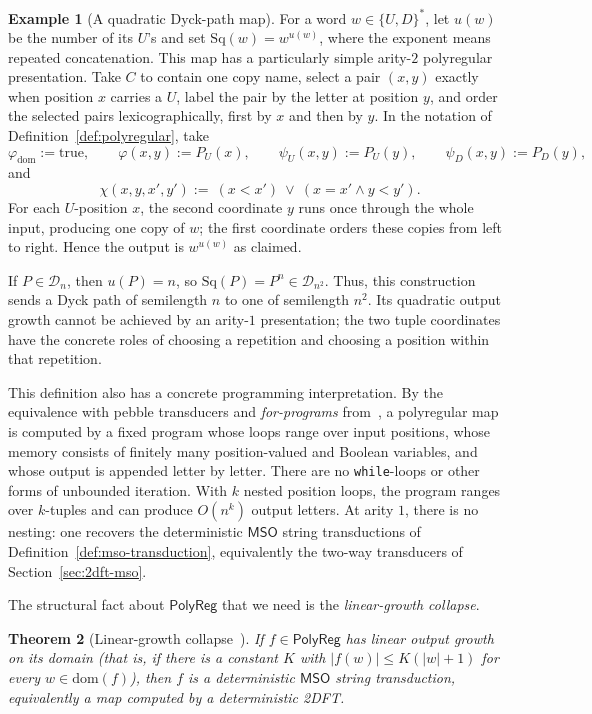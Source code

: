 \documentclass[11pt]{article}
\newtheorem{theorem}{Theorem}[section]
\theoremstyle{definition}
\newtheorem{example}[theorem]{Example}
\newcommand{\D}{\mathcal D}
\newcommand{\MSO}{\mathsf{MSO}}
\newcommand{\polyreg}{\mathsf{PolyReg}}
\begin{document}
\begin{example}[A quadratic Dyck-path map]
For a word $w\in\{U,D\}^*$, let $u(w)$ be the number of its $U$'s and set
$\mathrm{Sq}(w)=w^{u(w)}$, where the exponent means repeated concatenation.
This map has a particularly
simple arity-$2$ polyregular presentation.  Take $C$ to contain one copy name,
select a pair $(x,y)$ exactly when position $x$ carries a $U$, label the pair by
the letter at
position $y$, and order the selected pairs lexicographically, first by $x$ and
then by $y$.  In the notation of Definition~\ref{def:polyregular}, take
\[
  \varphi_{\mathrm{dom}}:=\mathrm{true},\qquad
  \varphi(x,y):=P_U(x),\qquad
  \psi_U(x,y):=P_U(y),\qquad
  \psi_D(x,y):=P_D(y),
\]
and
\[
  \chi(x,y,x',y') :=\ (x<x')\ \lor\ (x=x'\land y<y').
\]
For each $U$-position $x$, the second coordinate $y$ runs once through the
whole input, producing one copy of $w$; the first coordinate orders these
copies from left to right.  Hence the output is $w^{u(w)}$ as claimed.

If $P\in\D_n$, then $u(P)=n$, so
$\mathrm{Sq}(P)=P^n\in\D_{n^2}$.  Thus, this construction sends a Dyck path of
semilength $n$ to one of semilength $n^2$.  Its quadratic output growth cannot be achieved by an
arity-$1$ presentation; the two tuple coordinates have the concrete roles of
choosing a repetition and choosing a position within that repetition.
\end{example}

This definition also has a concrete programming interpretation.  By the
equivalence with pebble transducers and \emph{for-programs}
from~\cite{Bojanczyk2018,BojanczykKieferLhote2019}, a polyregular map is computed
by a fixed program whose loops range over input positions, whose memory
consists of finitely many position-valued and Boolean variables, and whose
output is appended letter by letter.  There are no \texttt{while}-loops or
other forms of unbounded iteration.  With $k$ nested position loops, the
program ranges over $k$-tuples and can produce $O(n^k)$ output letters.  At
arity $1$, there is no nesting: one recovers the deterministic $\MSO$
string transductions of Definition~\ref{def:mso-transduction}, equivalently
the two-way transducers of Section~\ref{sec:2dft-mso}.

The structural fact about $\polyreg$ that we need is the
\emph{linear-growth collapse}.

\begin{theorem}[Linear-growth collapse~\cite{Bojanczyk2023Growth}]
\label{thm:polyregular-linear-collapse}
If $f\in\polyreg$ has linear output growth on its domain (that is, if
there is a constant $K$ with $|f(w)|\le K(|w|+1)$ for every
$w\in\mathrm{dom}(f)$), then $f$ is a deterministic $\MSO$ string
transduction, equivalently a map computed by a deterministic 2DFT.
\end{theorem}
\end{document}

